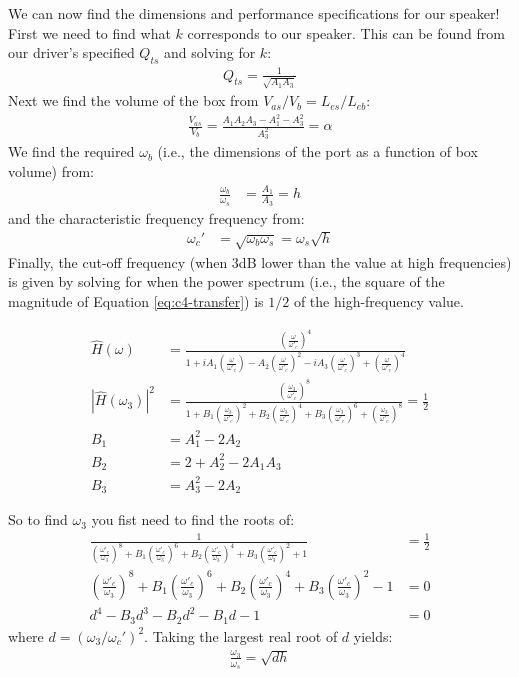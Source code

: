 \documentclass[10pt]{book}
\begin{document}
We can now find the dimensions and performance specifications for our speaker! First we need to find what $k$ corresponds to our speaker. This can be found from our driver's specified $Q_{ts}$ and solving for $k$:
\begin{align}
Q_{ts}=\frac{1}{\sqrt{A_1A_3}}
\end{align}
Next we find the volume of the box from $V_{as}/V_{b}=L_{es}/L_{eb}$:
\begin{align}
\frac{V_{as}}{V_{b}}=\frac{A_1A_2A_3-A_1^2-A_3^2}{A_3^2}=\alpha
\end{align}
We find the required $\omega_b$ (i.e., the dimensions of the port as a function of box volume) from:
\begin{align}
\frac{\omega_b}{\omega_s}&=\frac{A_1}{A_3}=h
\end{align}
and the characteristic frequency frequency from:
\begin{align}
\omega_c'&=\sqrt{\omega_b\omega_s}=\omega_s\sqrt{h}
\end{align}
Finally, the cut-off frequency (when 3dB lower than the value at high frequencies) is given by solving for when the power spectrum (i.e., the square of the magnitude of Equation \ref{eq:c4-transfer}) is $1/2$ of the high-frequency value.

\begin{align}
\hat{H}(\omega)&=\frac{\left(\frac{\omega}{\omega'_c}\right)^4}{1+iA_1 \left(\frac{\omega}{\omega'_c}\right)-A_2\left(\frac{\omega}{\omega'_c}\right)^2-iA_3\left(\frac{\omega}{\omega'_c}\right)^3+\left(\frac{\omega}{\omega'_c}\right)^4}\\
\left| \hat{H}(\omega_3) \right|^2 &=\frac{\left(\frac{\omega_3}{\omega'_c}\right)^8}{1+B_1 \left(\frac{\omega_3}{\omega'_c}\right)^2+B_2\left(\frac{\omega_3}{\omega'_c}\right)^4+B_3\left(\frac{\omega_3}{\omega'_c}\right)^6+\left(\frac{\omega_3}{\omega'_c}\right)^8}=\frac{1}{2}\\
B_1 &= A_1^2-2A_2\\
B_2 &= 2+A_2^2-2A_1A_3\\
B_3 &= A_3^2-2A_2
\end{align}

So to find $\omega_3$ you fist need to find the roots of:
\begin{align}
\frac{1}{\left(\frac{\omega'_c}{\omega_3}\right)^8+B_1 \left(\frac{\omega'_c}{\omega_3}\right)^6+B_2\left(\frac{\omega'_c}{\omega_3}\right)^4+B_3\left(\frac{\omega'_c}{\omega_3}\right)^2+1}&=\frac{1}{2}\\
\left(\frac{\omega'_c}{\omega_3}\right)^8+B_1 \left(\frac{\omega'_c}{\omega_3}\right)^6+B_2\left(\frac{\omega'_c}{\omega_3}\right)^4+B_3\left(\frac{\omega'_c}{\omega_3}\right)^2-1&=0\\
d^4-B_3 d^3- B_2 d^2 - B_1 d -1&=0
\end{align}
where $d=(\omega_3/\omega_c')^2$. Taking the largest real root of $d$ yields:
\begin{align}
\frac{\omega_3}{\omega_s}=\sqrt{dh}
\end{align}
\end{document}
